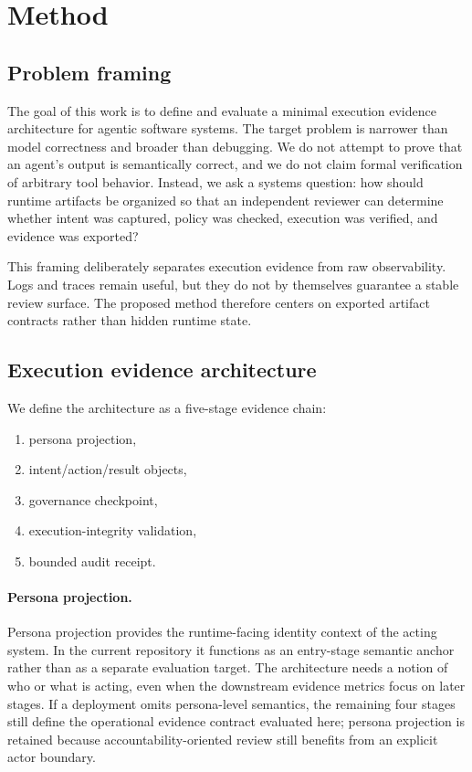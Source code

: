 \section{Method}
\label{sec:method}

\subsection{Problem framing}

The goal of this work is to define and evaluate a minimal execution evidence architecture for agentic software systems. The target problem is narrower than model correctness and broader than debugging. We do not attempt to prove that an agent's output is semantically correct, and we do not claim formal verification of arbitrary tool behavior. Instead, we ask a systems question: how should runtime artifacts be organized so that an independent reviewer can determine whether intent was captured, policy was checked, execution was verified, and evidence was exported?

This framing deliberately separates execution evidence from raw observability. Logs and traces remain useful, but they do not by themselves guarantee a stable review surface. The proposed method therefore centers on exported artifact contracts rather than hidden runtime state.

\subsection{Execution evidence architecture}

We define the architecture as a five-stage evidence chain:

\begin{enumerate}[leftmargin=1.8em]
  \item persona projection,
  \item intent/action/result objects,
  \item governance checkpoint,
  \item execution-integrity validation,
  \item bounded audit receipt.
\end{enumerate}

\paragraph{Persona projection.}
Persona projection provides the runtime-facing identity context of the acting system. In the current repository it functions as an entry-stage semantic anchor rather than as a separate evaluation target. The architecture needs a notion of who or what is acting, even when the downstream evidence metrics focus on later stages. If a deployment omits persona-level semantics, the remaining four stages still define the operational evidence contract evaluated here; persona projection is retained because accountability-oriented review still benefits from an explicit actor boundary.

